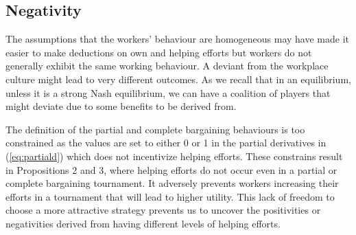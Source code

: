 \documentclass[a4paper,10pt]{article}
\theoremstyle{definition}
\begin{document}
\subsection*{Negativity}

The assumptions that the workers' behaviour are homogeneous may have made it easier to make deductions on own and helping efforts but workers do not generally exhibit the same working behaviour. A deviant from the workplace culture might lead to very different outcomes. As we recall that in an equilibrium, unless it is a strong Nash equilibrium, we can have a coalition of players that might deviate due to some benefits to be derived from. %

The definition of the partial and complete bargaining behaviours is too constrained as the values are set to either 0 or 1 in the partial derivatives in (\ref{eq:partiald}) which does not incentivize helping efforts. These constrains result in Propositions 2 and 3, where helping efforts do not occur even in a partial or complete bargaining tournament. It adversely prevents workers increasing their efforts in a tournament that will lead to higher utility. This lack of freedom to choose a more attractive strategy prevents us to uncover the positivities or negativities derived from having different levels of helping efforts.

%


%
%
%
\end{document}
